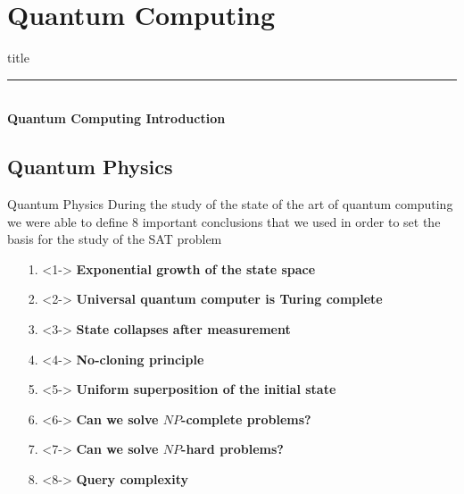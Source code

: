 \section{Quantum Computing}

	\begin{frame}[plain]
		\vfill
		\centering
		\begin{beamercolorbox}[sep=8pt,center,shadow=true,rounded=true]{title}
			\textbf{\insertsectionhead}\par%
			\color{polimiblue}\noindent\rule{10cm}{1pt} \\
			\textbf{Quantum Computing Introduction}
		\end{beamercolorbox}
		\vfill
	\end{frame}

	\subsection{Quantum Physics}
		\begin{frame}{Quantum Physics}
			During the study of the state of the art of quantum computing we were able to define 8 important conclusions that we used in order to set the basis for the study of the SAT problem
			\begin{itemize}
				\item[1.] <1-> \textbf{Exponential growth of the state space}
				\item[2.] <2-> \textbf{Universal quantum computer is Turing complete}
				\item[3.] <3-> \textbf{State collapses after measurement}
				\item[4.] <4-> \textbf{No-cloning principle}
				\item[5.] <5-> \textbf{Uniform superposition of the initial state}
				\item[6.] <6-> \textbf{Can we solve $NP$-complete problems?}
				\item[7.] <7-> \textbf{Can we solve $NP$-hard problems?}
				\item[8.] <8-> \textbf{Query complexity}
			\end{itemize}
		\end{frame}
	
